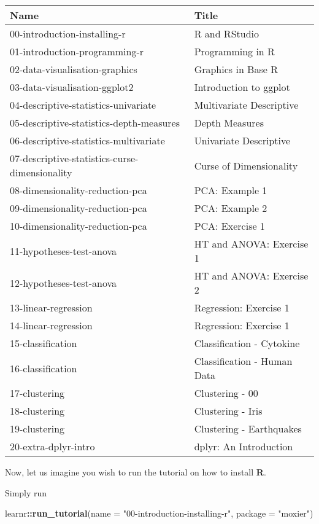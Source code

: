 \documentclass[]{book}
\newenvironment{Shaded}{\begin{snugshade}}{\end{snugshade}}
\newcommand{\KeywordTok}[1]{\textcolor[rgb]{0.13,0.29,0.53}{\textbf{#1}}}
\newcommand{\DataTypeTok}[1]{\textcolor[rgb]{0.13,0.29,0.53}{#1}}
\newcommand{\StringTok}[1]{\textcolor[rgb]{0.31,0.60,0.02}{#1}}
\newcommand{\OperatorTok}[1]{\textcolor[rgb]{0.81,0.36,0.00}{\textbf{#1}}}
\newcommand{\NormalTok}[1]{#1}
\begin{document}
\begin{tabular}{l|l}
\hline
Name & Title\\
\hline
00-introduction-installing-r & R and RStudio\\
\hline
01-introduction-programming-r & Programming in R\\
\hline
02-data-visualisation-graphics & Graphics in Base R\\
\hline
03-data-visualisation-ggplot2 & Introduction to ggplot\\
\hline
04-descriptive-statistics-univariate & Multivariate Descriptive\\
\hline
05-descriptive-statistics-depth-measures & Depth Measures\\
\hline
06-descriptive-statistics-multivariate & Univariate Descriptive\\
\hline
07-descriptive-statistics-curse-dimensionality & Curse of Dimensionality\\
\hline
08-dimensionality-reduction-pca & PCA: Example 1\\
\hline
09-dimensionality-reduction-pca & PCA: Example 2\\
\hline
10-dimensionality-reduction-pca & PCA: Exercise 1\\
\hline
11-hypotheses-test-anova & HT and ANOVA: Exercise 1\\
\hline
12-hypotheses-test-anova & HT and ANOVA: Exercise 2\\
\hline
13-linear-regression & Regression: Exercise 1\\
\hline
14-linear-regression & Regression: Exercise 1\\
\hline
15-classification & Classification - Cytokine\\
\hline
16-classification & Classification - Human Data\\
\hline
17-clustering & Clustering - 00\\
\hline
18-clustering & Clustering - Iris\\
\hline
19-clustering & Clustering - Earthquakes\\
\hline
20-extra-dplyr-intro & dplyr: An Introduction\\
\hline
\end{tabular}

Now, let us imagine you wish to run the tutorial on how to install
\textbf{R}.

Simply run

\begin{Shaded}
\begin{Highlighting}[]
\NormalTok{learnr}\OperatorTok{::}\KeywordTok{run_tutorial}\NormalTok{(}\DataTypeTok{name =} \StringTok{"00-introduction-installing-r"}\NormalTok{, }\DataTypeTok{package =} \StringTok{"moxier"}\NormalTok{)}
\end{Highlighting}
\end{Shaded}
\end{document}

